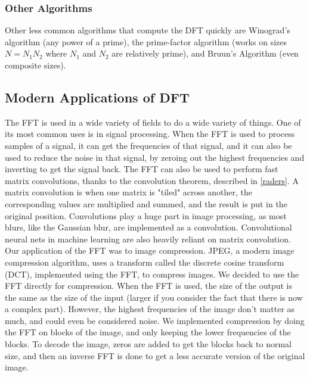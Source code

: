 	\subsubsection{Other Algorithms}
		Other less common algorithms that compute the DFT quickly are Winograd's algorithm (any power of a prime), the prime-factor algorithm (works on sizes $N=N_1N_2$ where $N_1$ and $N_2$ are relatively prime), and Bruun's Algorithm (even composite sizes).
\subsection{Modern Applications of DFT}
	The FFT is used in a wide variety of fields to do a wide variety of things. One of its most common uses is in signal processing. When the FFT is used to process samples of a signal, it can get the frequencies of that signal, and it can also be used to reduce the noise in that signal, by zeroing out the highest frequencies and inverting to get the signal back. The FFT can also be used to perform fast matrix convolutions, thanks to the convolution theorem, described in \ref{raders}. A matrix convolution is when one matrix is "tiled" across another, the corresponding values are multiplied and summed, and the result is put in the original position. Convolutions play a huge part in image processing, as most blurs, like the Gaussian blur, are implemented as a convolution. Convolutional neural nets in machine learning are also heavily reliant on matrix convolution. \\
	Our application of the FFT was to image compression. JPEG, a modern image compression algorithm, uses a transform called the discrete cosine transform (DCT), implemented using the FFT, to compress images. We decided to use the FFT directly for compression. When the FFT is used, the size of the output is the same as the size of the input (larger if you consider the fact that there is now a complex part). However, the highest frequencies of the image don't matter as much, and could even be considered noise. We implemented compression by doing the FFT on blocks of the image, and only keeping the lower frequencies of the blocks. To decode the image, zeros are added to get the blocks back to normal size, and then an inverse FFT is done to get a less accurate version of the original image.
